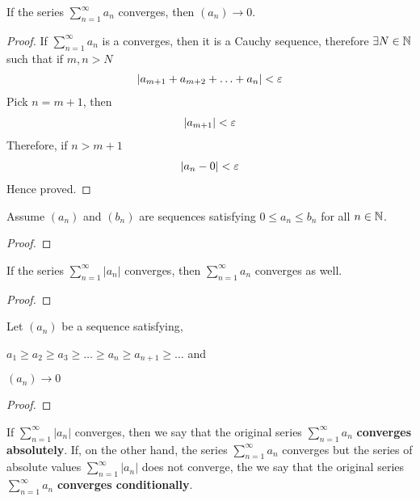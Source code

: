 \begin{theorem}
	If the series $\sum_{n=1}^{\infty} a_n$ converges, then $\left( a_n \right) \to 0$.
\end{theorem}

\begin{proof}
	If $\sum_{n=1}^{\infty} a_n$ is a converges, then it is a Cauchy sequence, therefore $\exists N \in \mathbb{N}$ such that if $m, n > N$
	\begin{align}
		\left|a_{m+1} + a_{m+2} + \ldots + a_n\right| < \e
	\end{align}
	Pick $n = m + 1$, then
	\begin{align}
		\left|a_{m+1}\right| < \e
	\end{align}
	Therefore, if $n > m + 1$ 
	\begin{align}
		\left|a_n - 0\right| < \e
	\end{align} 
	Hence proved.
\end{proof}

\begin{theorem}
	Assume $\left( a_n \right) $ and $\left( b_n \right) $ are sequences satisfying $0 \le a_n \le  b_n$ for all $n \in \mathbb{N}$.
\end{theorem}

\begin{proof}
	
\end{proof}

\begin{theorem}
	If the series $\sum_{n=1}^{\infty} \left|a_n\right|$ converges, then $\sum_{n=1}^{\infty} a_n$ converges as well. 
\end{theorem}

\begin{proof}
	
\end{proof}

\begin{theorem}
	Let $\left( a_n \right) $ be a sequence satisfying,
	\begin{romanize}
		\item $a_1 \ge a_2 \ge a_3 \ge  \ldots \ge  a_n \ge  a_{n+1} \ge \ldots$ and
		\item $\left( a_n \right) \to 0$
	\end{romanize}
\end{theorem}

\begin{proof}
	
\end{proof}

\begin{definition}
	If $\sum_{n=1}^{\infty} \left|a_n\right|$ converges, then we say that the original series $\sum_{n=1}^{\infty} a_n$ \textbf{converges absolutely}. If, on the other hand, the series $\sum_{n=1}^{\infty} a_n$ converges but the series of absolute values $\sum_{n=1}^{\infty} \left|a_n\right|$ does not converge, the we say that the original series $\sum_{n=1}^{\infty} a_n$ \textbf{converges conditionally}.
\end{definition}
